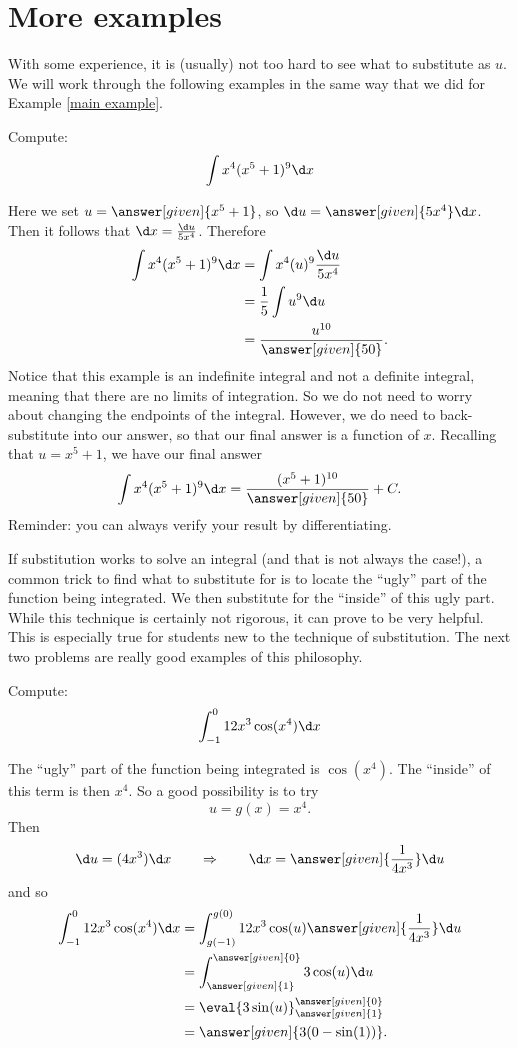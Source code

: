 \documentclass{ximera}
\begin{document}
\section{More examples}

With some experience, it is (usually) not too hard to see what to
substitute as $u$.  We will work through the following examples in the
same way that we did for Example \ref{main example}.
\begin{example}
Compute:
\[
\int x^4(x^5+1)^{9} \d x
\]
\begin{explanation}
Here we set $u =  \answer[given]{x^5+1}$, so $\d u =  \answer[given]{5x^4} \d x$.  Then
it follows that $\d x=\frac{\d u}{5x^4}$. Therefore
\begin{align*}
  \int x^4(x^5+1)^{9} \d x &= \int x^4 (u)^{9} \frac{\d u}{5x^4} \\
  &= \frac{1}{5} \int u^{9} \d u\\
&=\frac{u^{10}}{ \answer[given]{50}}.
\end{align*}
Notice that this example is an indefinite integral and not a definite
integral, meaning that there are no limits of integration.  So we do
not need to worry about changing the endpoints of the integral.  However,
we do need to back-substitute into our answer, so that our final
answer is a function of $x$.  Recalling that $u= x^5+1$, we have
our final answer
\[
\int x^4(x^5+1)^{9} \d x= \frac{(x^5+1)^{10}}{\answer[given]{50}}+C.
\]
Reminder: you can always verify your result by differentiating.

\end{explanation}
\end{example}


If substitution works to solve an integral (and that is not always the
case!), a common trick to find what to substitute for is to locate the
``ugly'' part of the function being integrated.  We then substitute
for the ``inside'' of this ugly part.  While this technique is
certainly not rigorous, it can prove to be very helpful.  This is
especially true for students new to the technique of substitution.
The next two problems are really good examples of this philosophy.

\begin{example}
Compute:
\[
\int_{-1}^0 12x^3 \cos({x^4}) \d x
\]
\begin{explanation}
The ``ugly'' part of the function being integrated is $\cos({x^4})$.  The
``inside'' of this term is then $x^4$.  So a good possibility is to
try
\[
u =g(x)= x^4.
\]
Then
\[
\d u = (4x^3) \d x 	\qquad	\Rightarrow	\qquad	\d x = \answer[given]{\frac{1}{4x^3}} \d u
\]
and so
\begin{align*}
\int_{-1}^0 12x^3 \cos({x^4}) \d x &= \int_{g(-1)}^{g(0)} 12 x^3 \cos({u}) \answer[given]{\frac{1}{4x^3}} \d u  \\
&= \int_{\answer[given]{1}}^{\answer[given]{0}} 3 \cos({u}) \d u  \\
&= \eval{3\sin({u})}_{\answer[given]{1}}^{\answer[given]{0}}  \\
&= \answer[given]{3(0-\sin({1}))}.
\end{align*}
\end{explanation}
\end{example}
\end{document}
